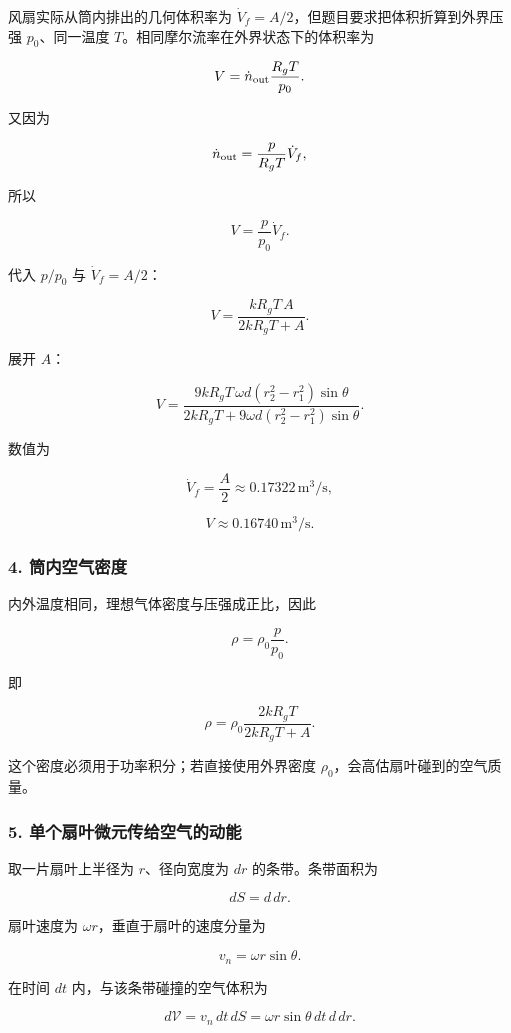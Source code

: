 \documentclass[12pt,a4paper,UTF8]{ctexart}
\begin{document}
风扇实际从筒内排出的几何体积率为
\(\dot V_f=A/2\)，但题目要求把体积折算到外界压强 \(p_0\)、同一温度
\(T\)。相同摩尔流率在外界状态下的体积率为

\[
V=\dot n_{\rm out}\frac{R_gT}{p_0}.
\]

又因为

\[
\dot n_{\rm out}=\frac{p}{R_gT}\dot V_f,
\]

所以

\[
V=\frac{p}{p_0}\dot V_f.
\]

代入 \(p/p_0\) 与 \(\dot V_f=A/2\)：

\[
\boxed{
V=\frac{kR_gT\,A}{2kR_gT+A}
}.
\]

展开 \(A\)：

\[
\boxed{
V=
\frac{9kR_gT\,\omega d(r_2^2-r_1^2)\sin\theta}
{2kR_gT+9\omega d(r_2^2-r_1^2)\sin\theta}
}.
\]

数值为

\[
\dot V_f=\frac{A}{2}\approx0.17322\,\mathrm{m^3/s},
\]

\[
\boxed{V\approx0.16740\,\mathrm{m^3/s}}.
\]

\subsubsection{4.
筒内空气密度}\label{ux7b52ux5185ux7a7aux6c14ux5bc6ux5ea6}

内外温度相同，理想气体密度与压强成正比，因此

\[
\rho=\rho_0\frac{p}{p_0}.
\]

即

\[
\rho=\rho_0\frac{2kR_gT}{2kR_gT+A}.
\]

这个密度必须用于功率积分；若直接使用外界密度
\(\rho_0\)，会高估扇叶碰到的空气质量。

\subsubsection{5.
单个扇叶微元传给空气的动能}\label{ux5355ux4e2aux6247ux53f6ux5faeux5143ux4f20ux7ed9ux7a7aux6c14ux7684ux52a8ux80fd}

取一片扇叶上半径为 \(r\)、径向宽度为 \(dr\) 的条带。条带面积为

\[
dS=d\,dr.
\]

扇叶速度为 \(\omega r\)，垂直于扇叶的速度分量为

\[
v_n=\omega r\sin\theta.
\]

在时间 \(dt\) 内，与该条带碰撞的空气体积为

\[
d\mathcal V=v_n\,dt\,dS
=\omega r\sin\theta\,dt\,d\,dr.
\]
\end{document}
